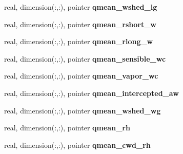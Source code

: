 \begin{DoxyCompactItemize}
\item 
\hypertarget{structed__state__vars_1_1edtype_a22da0a3f516a9288fcd4990cf5655492}{
real, dimension(:,:), pointer {\bfseries qmean\_\-wshed\_\-lg}}
\label{structed__state__vars_1_1edtype_a22da0a3f516a9288fcd4990cf5655492}

\item 
\hypertarget{structed__state__vars_1_1edtype_acdc5ec1f3d9af7aaaa9cddaaef7aa260}{
real, dimension(:,:), pointer {\bfseries qmean\_\-rshort\_\-w}}
\label{structed__state__vars_1_1edtype_acdc5ec1f3d9af7aaaa9cddaaef7aa260}

\item 
\hypertarget{structed__state__vars_1_1edtype_a40c728c9d9c93ec98e8923ad3a51b741}{
real, dimension(:,:), pointer {\bfseries qmean\_\-rlong\_\-w}}
\label{structed__state__vars_1_1edtype_a40c728c9d9c93ec98e8923ad3a51b741}

\item 
\hypertarget{structed__state__vars_1_1edtype_a606b2c9f27d5d12ff43103539b415b38}{
real, dimension(:,:), pointer {\bfseries qmean\_\-sensible\_\-wc}}
\label{structed__state__vars_1_1edtype_a606b2c9f27d5d12ff43103539b415b38}

\item 
\hypertarget{structed__state__vars_1_1edtype_ac978430cd7a69089044ad9ea27097132}{
real, dimension(:,:), pointer {\bfseries qmean\_\-vapor\_\-wc}}
\label{structed__state__vars_1_1edtype_ac978430cd7a69089044ad9ea27097132}

\item 
\hypertarget{structed__state__vars_1_1edtype_aef8927658b6bfe501894523920305c8f}{
real, dimension(:,:), pointer {\bfseries qmean\_\-intercepted\_\-aw}}
\label{structed__state__vars_1_1edtype_aef8927658b6bfe501894523920305c8f}

\item 
\hypertarget{structed__state__vars_1_1edtype_a2bc0674b95f7248fc68fb042a1aa78b2}{
real, dimension(:,:), pointer {\bfseries qmean\_\-wshed\_\-wg}}
\label{structed__state__vars_1_1edtype_a2bc0674b95f7248fc68fb042a1aa78b2}

\item 
\hypertarget{structed__state__vars_1_1edtype_a9d02fd527e08d2d6cf3ce5d955aed9ce}{
real, dimension(:,:), pointer {\bfseries qmean\_\-rh}}
\label{structed__state__vars_1_1edtype_a9d02fd527e08d2d6cf3ce5d955aed9ce}

\item 
\hypertarget{structed__state__vars_1_1edtype_a9527e8c062da4671b30f3e3ab986b5e2}{
real, dimension(:,:), pointer {\bfseries qmean\_\-cwd\_\-rh}}
\label{structed__state__vars_1_1edtype_a9527e8c062da4671b30f3e3ab986b5e2}


\end{DoxyCompactItemize}
